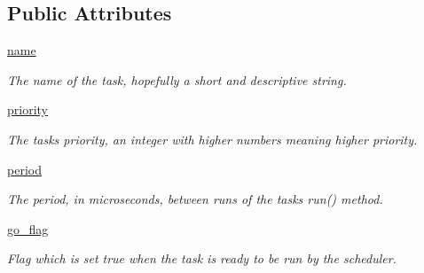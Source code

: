 \subsection*{Public Attributes}
\begin{DoxyCompactItemize}
\item 
\mbox{\hyperlink{classcotask_1_1Task_ab54e069dd0b4f0a2f8e7f00c94998a10}{name}}
\begin{DoxyCompactList}\small\item\em The name of the task, hopefully a short and descriptive string. \end{DoxyCompactList}\item 
\mbox{\hyperlink{classcotask_1_1Task_aeced93c7b7d23e33de9693d278aef88b}{priority}}
\begin{DoxyCompactList}\small\item\em The task\textquotesingle{}s priority, an integer with higher numbers meaning higher priority. \end{DoxyCompactList}\item 
\mbox{\hyperlink{classcotask_1_1Task_a44f980f61f1908764c6821fa886590ca}{period}}
\begin{DoxyCompactList}\small\item\em The period, in microseconds, between runs of the task\textquotesingle{}s {\ttfamily run()} method. \end{DoxyCompactList}\item 
\mbox{\label{classcotask_1_1Task_a96733bb9f4349a3f284083d1d4e64f9f}} 
\mbox{\hyperlink{classcotask_1_1Task_a96733bb9f4349a3f284083d1d4e64f9f}{go\+\_\+flag}}
\begin{DoxyCompactList}\small\item\em Flag which is set true when the task is ready to be run by the scheduler. \end{DoxyCompactList}\end{DoxyCompactItemize}


